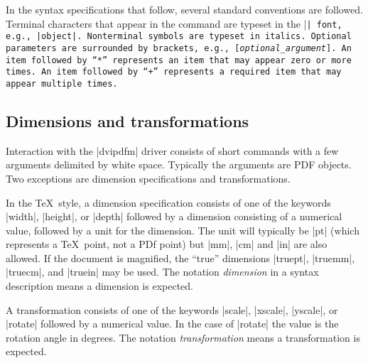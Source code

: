 In the syntax specifications that follow, several
standard conventions are followed.  Terminal
characters that appear in the command 
are typeset in the |\tt| font, e.g., |object|.
Nonterminal symbols are typeset in italics.
Optional parameters are surrounded by brackets, e.g.,
[{\it optional\_argument}].  An item followed
by~``{*}'' represents an item that may appear
zero or more times.  An item followed by~``{+}''
represents a required item that may appear multiple times.

\subsection{Dimensions and transformations}
Interaction with the |dvipdfm| driver consists
of short commands with a few arguments delimited by white space.
Typically the arguments are PDF objects.
Two exceptions are dimension specifications and transformations.

In the \TeX\ style, a dimension specification consists of one of the keywords
|width|, |height|, or |depth| followed by a dimension
consisting of a numerical value, followed by a unit for the dimension.  The
unit will typically be |pt| (which represents a \TeX\ point, not a
PDf point) but |mm|, |cm| and |in| are also allowed.
If the document is magnified, the ``true'' dimensions |truept|,
|truemm|, |truecm|, and |truein| may be used.  The notation
{\it dimension\/} in a syntax description means a dimension is expected.

A transformation consists of one of the keywords |scale|, |xscale|,
|yscale|, or |rotate| followed by a numerical value.  In the
case of |rotate| the value is the rotation angle in degrees.
The notation
{\it transformation} means a transformation is expected. 

